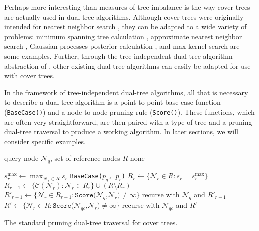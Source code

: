 Perhaps more interesting than measures of tree imbalance is the way cover trees
are actually used in dual-tree algorithms.  Although cover trees were originally
intended for nearest neighbor search \citep[See Algorithm
\texttt{Find-All-Nearest},][]{langford2006}, they can be adapted to a wide
variety of problems: minimum
spanning tree calculation \citep{march2010euclidean}, approximate nearest neighbor
search \citep{ram2009rank}, Gaussian processes posterior calculation
\citep{moore2014fast}, and max-kernel search \citep{curtin2014dual} are some
examples.  Further, through the tree-independent dual-tree algorithm abstraction
of \citet{curtin2013tree}, other existing dual-tree algorithms can easily be
adapted for use with cover trees.

In the framework of tree-independent dual-tree algorithms, all that is necessary
to describe a dual-tree algorithm is a point-to-point base case function
(\texttt{BaseCase()}) and a node-to-node pruning rule (\texttt{Score()}).  These
functions, which are often very straightforward, are then paired with a type of
tree and a pruning dual-tree traversal to produce a working algorithm.  In later
sections, we will consider specific examples.

\begin{algorithm}[tb]
  \begin{algorithmic}[1]
     query node $\mathscr{N}_q$, set of reference nodes
$R$ \label{alg:line:ct-dual-input}
     none

    \medskip
    \STATE $s^{\max}_r \gets \max_{\mathscr{N}_r \in R} s_r$
\label{alg:line:ct-dual-srmax}
     \label{alg:line:ct-dual-ref-recursion-start}
      \STATE {}
       \label{alg:line:ct-dual-base-case-start}
        \STATE \texttt{BaseCase($p_q$, $p_r$)}
      \ENDFOR \label{alg:line:ct-dual-base-case-end}
      \STATE $R_r \gets \{ \mathscr{N}_r \in R : s_r = s^{\max}_r \}$
\label{alg:line:ct-dual-ref-set}
      \STATE $R_{r - 1} \gets \{ \mathscr{C}(\mathscr{N}_r) : \mathscr{N}_r \in
R_r \} \cup (R \setminus R_r)$ \label{alg:line:ct-dual-ref-children}
      \STATE $R'_{r - 1} \gets \{ \mathscr{N}_r \in R_{r - 1} :
\texttt{Score(}\mathscr{N}_q\texttt{,} \mathscr{N}_r\texttt{)} \ne \infty \}$
\label{alg:line:ct-dual-ref-score}
      \STATE recurse with $\mathscr{N}_q$ and $R'_{r - 1}$
\label{alg:line:ct-dual-ref-recursion-end}
    \ELSE \label{alg:line:ct-dual-query-recursion-start}
      \STATE {}
        \STATE $R' \gets \{ \mathscr{N}_r \in R :
\texttt{Score(}\mathscr{N}_{qc}\texttt{,} \mathscr{N}_r\texttt{)} \ne \infty \}$
\label{alg:line:ct-dual-query-pruning}
        \STATE recurse with $\mathscr{N}_{qc}$ and $R'$
\label{alg:line:ct-dual-query-recursion}
      \ENDFOR \label{alg:line:ct-dual-query-recursion-end}
    \ENDIF
  \end{algorithmic}
  \caption{The standard pruning dual-tree traversal for cover trees.}
  \label{alg:cover-tree-dual}
\end{algorithm}

